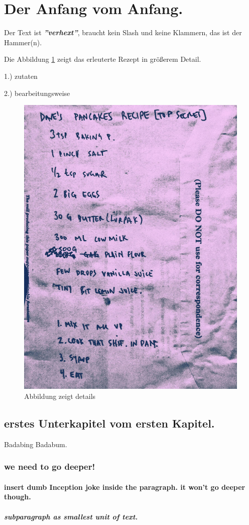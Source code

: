 \section{Der Anfang vom Anfang.}
    Der Text ist \textit{\textbf{''verhext''}}, braucht kein Slash und keine Klammern, 
    das ist der Hammer(n).
    
        Die Abbildung \ref{fig:DAVES_PANCAKES_RECIPE} zeigt das erleuterte Rezept
        in größerem Detail. 

        1.) zutaten

        2.) bearbeitungsweise

        \begin{figure}[H]
            \centering
            \includegraphics[width=0.5\linewidth]{graphics/DAVES_PANCAKES_RECIPE.jpg}
            \caption[cooles rezept]{Abbildung zeigt details}
    
            
            \label{fig:DAVES_PANCAKES_RECIPE}
        \end{figure}
        
        \subsection {erstes Unterkapitel vom ersten Kapitel.}
        Badabing Badabum.

            \subsubsection{we need to go deeper!}

                \paragraph{insert dumb Inception joke inside the paragraph. it won't go deeper though.} 
                   
                    \subparagraph{subparagraph as smallest unit of text.}

        